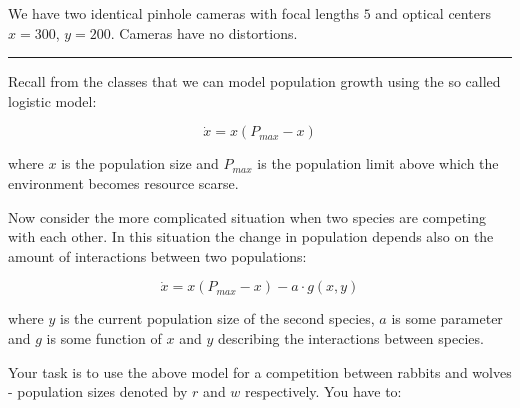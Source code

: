 \documentclass{exam}
\begin{document}
\begin{questions}
\question


We have two identical pinhole cameras with focal lengths
$5$ and optical centers $x = 300$, $y = 200$.
Cameras have no distortions.


\vspace*{1cm}
\hrule
\vspace*{0.5cm}


Recall from the classes that we can model population growth using the so
called logistic model:

\[\dot{x} = x(P_{max}-x)\]

where $x$ is the population size and $P_{max}$ is the population
limit above which the environment becomes resource scarse.

Now consider the more complicated situation when two species are
competing with each other. In this situation the change in population
depends also on the amount of interactions between two populations:

\[\dot{x} = x(P_{max}-x) - a \cdot g(x,y)\]

where $y$ is the current population size of the second species, $a$ is
some parameter and $g$ is some function of $x$ and $y$ describing the interactions between species.

Your task is to use the above model for a competition between rabbits and
wolves - population sizes denoted by $r$ and $w$ respectively. You have
to:

\begin{parts}

\end{parts}
\end{questions}
\end{document}
